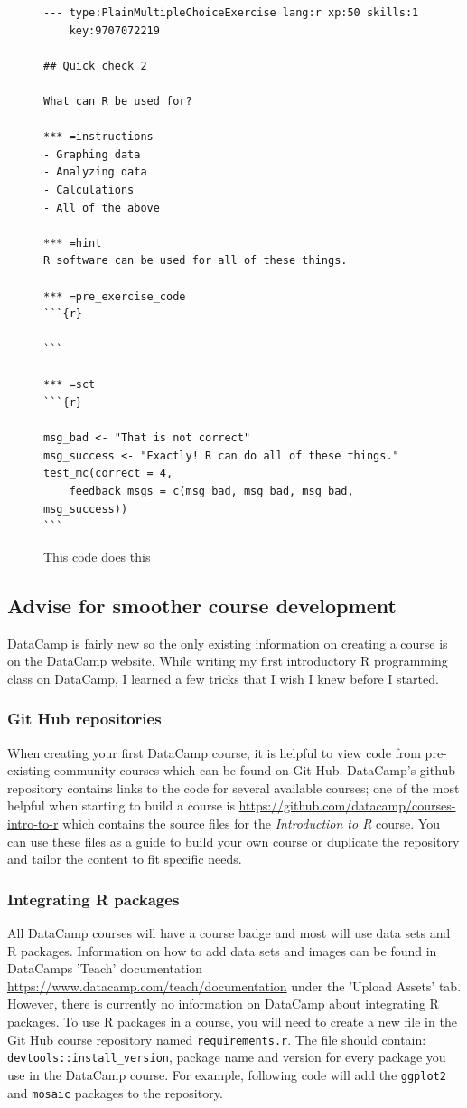 \documentclass[12pt]{article}\usepackage[]{graphicx}\usepackage[]{color}
\begin{document}
\begin{figure}
\caption{This code does this}
\begin{Verbatim}[frame=single]
--- type:PlainMultipleChoiceExercise lang:r xp:50 skills:1
    key:9707072219

## Quick check 2

What can R be used for?

*** =instructions
- Graphing data
- Analyzing data
- Calculations
- All of the above

*** =hint
R software can be used for all of these things.

*** =pre_exercise_code
```{r}

```

*** =sct
```{r}

msg_bad <- "That is not correct"
msg_success <- "Exactly! R can do all of these things."
test_mc(correct = 4, 
    feedback_msgs = c(msg_bad, msg_bad, msg_bad, msg_success))
```
\end{Verbatim}
\end{figure}
\subsection{Advise for smoother course development}
DataCamp is fairly new so the only existing information on creating a course is on the DataCamp website. While writing my first introductory R programming class on DataCamp, I learned a few tricks that I wish I knew before I started. 
\subsubsection{Git Hub repositories}
When creating your first DataCamp course, it is helpful to view code from pre-existing community courses which can be found on Git Hub.
DataCamp's github repository contains links to the code for several available courses; one of the most helpful when starting to build a course 
is \url{https://github.com/datacamp/courses-intro-to-r} which contains the source files for the \textit{Introduction to R} course.
You can use these files as a guide to build your own course or duplicate the repository and tailor the content to fit specific needs.

\subsubsection{Integrating R packages}
All DataCamp courses will have a course badge and most will use data sets and R packages. Information on how to add data sets and images
can be found in DataCamps 'Teach' documentation \url{https://www.datacamp.com/teach/documentation} under the 'Upload Assets' tab. However,
there is currently no information on DataCamp about integrating R packages. To use R packages in a course, you will need to create a new file
in the Git Hub course repository named \texttt{requirements.r}. The file should contain: \texttt{devtools::install\_version}, package name and version for 
every package you use in the DataCamp course. For example, following code will add the \texttt{ggplot2} and \texttt{mosaic} packages to the repository.
\end{document}
